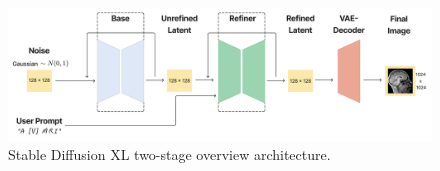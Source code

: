 \begin{figure}[H] 
\centering
\includegraphics[width=\columnwidth]{main/content/images/diagrams/sd_xl.png}
\caption{Stable Diffusion XL two-stage overview architecture.}
\label{fig:xl_diagram}
\end{figure}
